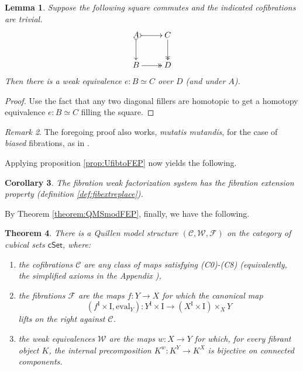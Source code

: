 \documentclass[12pt]{article}
\newcommand{\CC}{\ensuremath{\mathcal{C}}}
\newcommand{\WW}{\ensuremath{\mathcal{W}}}
\newcommand{\FF}{\ensuremath{\mathcal{F}}}
\newcommand{\cSet}{\ensuremath{\mathsf{cSet}}}
\newcommand{\ra}{\ensuremath{\rightarrow}}
\renewcommand{\to}{\ensuremath{\rightarrow}}
\newcommand{\I}{\ensuremath{\mathrm{I}}}
\newtheorem{theorem}{Theorem}
\newtheorem{lemma}[theorem]{Lemma}
\newtheorem{corollary}[theorem]{Corollary}
\theoremstyle{remark}
\newtheorem{remark}[theorem]{Remark}
\theoremstyle{definition}
\begin{document}
\begin{lemma}\label{lem:simple}
Suppose the following square commutes and the indicated cofibrations are trivial.
\begin{equation}\label{diag:standard1}
\xymatrix{
A \ar@{>->}[d] \ar@{>->}[r] & C \ar@{>>}[d] \\
B  \ar@{>>}[r] &  D \\
}
\end{equation}
Then there is a weak equivalence $e : B \simeq C$ over $D$ (and under $A$).
\end{lemma}
\begin{proof}
Use the fact that any two diagonal fillers are homotopic to get a homotopy equivalence $e : B \simeq C$ filling the square.
\end{proof}

\begin{remark}
The foregoing proof also works, \emph{mutatis mutandis}, for the case of \emph{biased} fibrations, as in \cite{CCHM}.
\end{remark}

Applying proposition \ref{prop:UfibtoFEP} now yields the following.

\begin{corollary}\label{cor:FEP}
The fibration weak factorization system has the fibration extension property (definition \ref{def:fibextreplace}). 
\end{corollary}

By Theorem \ref{theorem:QMSmodFEP}, finally, we have the following.

\begin{theorem}\label{theorem:QMS}
There is a Quillen model structure $(\CC,\WW,\FF)$ on the category of cubical sets $\cSet$, where:
\begin{enumerate}
\item the cofibrations $\CC$ are any class of maps satisfying (C0)-(C8) (equivalently, the simplified axioms in the Appendix%
),
\item the fibrations $\FF$ are the maps $f : Y\ra X$ for which the canonical map 
\[
(f^\I \times \I, \mathrm{eval}_Y) : Y^\I \times \I\ra (X^\I \times \I)\times_X Y
\]
lifts on the right against $\CC$.
\item the weak equivalences $\WW$ are the maps $w : X\ra Y$  for which, for every fibrant object $K$, the internal precomposition $K^w : K^Y \to K^X$ is bijective on connected components.
\end{enumerate}
\end{theorem}
\end{document}
